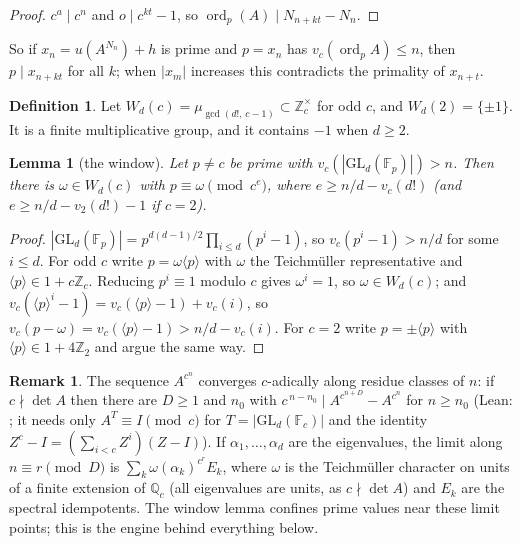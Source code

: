 \documentclass[11pt]{amsart}
\newtheorem{lemma}[theorem]{Lemma}
\theoremstyle{definition}
\newtheorem{definition}[theorem]{Definition}
\newtheorem{remark}[theorem]{Remark}
\newcommand{\Z}{\mathbb{Z}}
\newcommand{\Q}{\mathbb{Q}}
\newcommand{\F}{\mathbb{F}}
\newcommand{\GL}{\mathrm{GL}}
\newcommand{\ord}{\operatorname{ord}}
\begin{document}
\begin{proof}
$c^a\mid c^n$ and $o\mid c^{kt}-1$, so $\ord_p(A)\mid N_{n+kt}-N_n$.
\end{proof}

So if $x_n=u(A^{N_n})+h$ is prime and $p=x_n$ has $v_c(\ord_p A)\le n$, then $p\mid x_{n+kt}$ for all $k$; when $|x_m|$ increases this contradicts the primality of $x_{n+t}$.

\begin{definition}
Let $W_d(c)=\mu_{\gcd(d!,\,c-1)}\subset\Z_c^\times$ for odd $c$, and $W_d(2)=\{\pm1\}$.  It is a finite multiplicative group, and it contains $-1$ when $d\ge2$.
\end{definition}

\begin{lemma}[the window]\label{lem:window}
Let $p\neq c$ be prime with $v_c(|\GL_d(\F_p)|)>n$.  Then there is $\omega\in W_d(c)$ with $p\equiv\omega\pmod{c^{e}}$, where $e\ge n/d-v_c(d!)$ (and $e\ge n/d-v_2(d!)-1$ if $c=2$).
\end{lemma}

\begin{proof}
$|\GL_d(\F_p)|=p^{d(d-1)/2}\prod_{i\le d}(p^i-1)$, so $v_c(p^i-1)>n/d$ for some $i\le d$.  For odd $c$ write $p=\omega\langle p\rangle$ with $\omega$ the Teichm\"uller representative and $\langle p\rangle\in1+c\Z_c$.  Reducing $p^i\equiv1$ modulo $c$ gives $\omega^i=1$, so $\omega\in W_d(c)$; and $v_c(\langle p\rangle^i-1)=v_c(\langle p\rangle-1)+v_c(i)$, so $v_c(p-\omega)=v_c(\langle p\rangle -1)>n/d-v_c(i)$.  For $c=2$ write $p=\pm\langle p\rangle$ with $\langle p\rangle\in1+4\Z_2$ and argue the same way.
\end{proof}

\begin{remark}\label{rem:limits}
The sequence $A^{c^n}$ converges $c$-adically along residue classes of $n$: if $c\nmid\det A$ then there are $D\ge1$ and $n_0$ with $c^{\,n-n_0}\mid A^{c^{n+D}}-A^{c^n}$ for $n\ge n_0$ (Lean: ; it needs only $A^{T}\equiv I\pmod c$ for $T=|\GL_d(\F_c)|$ and the identity $Z^c-I=(\sum_{i<c}Z^i)(Z-I)$).  If $\alpha_1,\dots,\alpha_d$ are the eigenvalues, the limit along $n\equiv r\pmod D$ is $\sum_k \omega(\alpha_k)^{c^r}E_k$, where $\omega$ is the Teichm\"uller character on units of a finite extension of $\Q_c$ (all eigenvalues are units, as $c\nmid\det A$) and $E_k$ are the spectral idempotents.  The window lemma confines prime values near these limit points; this is the engine behind everything below.
\end{remark}
\end{document}
